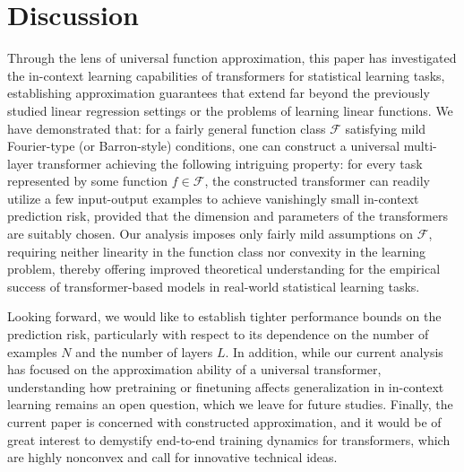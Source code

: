 \documentclass[english]{article}
\begin{document}

\section{Discussion}
\label{sec:discussion}

Through the lens of universal function approximation, this paper has investigated the in-context learning capabilities of transformers for statistical learning tasks,  
establishing approximation guarantees that extend far beyond the previously studied linear regression settings or the problems of learning linear functions. 
We have demonstrated that: for a fairly general function class $\mathcal{F}$ satisfying mild Fourier-type (or Barron-style) conditions, one can construct a universal multi-layer transformer achieving the following intriguing property:  for every task represented by some function $f\in\mathcal{F}$, 
the constructed transformer can readily utilize a few input-output examples to achieve vanishingly small in-context prediction risk, provided that the dimension and parameters of the transformers are suitably chosen. 
%
%
Our analysis imposes only fairly mild assumptions on $\mathcal{F}$, requiring neither linearity in the function class nor convexity in the learning problem, thereby offering improved theoretical understanding for the empirical success of transformer-based models in real-world statistical learning tasks.

Looking forward, we would like to establish tighter performance bounds on the prediction risk, particularly with respect to its dependence on the number of examples $N$ and the number of layers $L$. In addition, while our current analysis has focused on the approximation ability of a universal transformer, understanding how pretraining or finetuning affects generalization in in-context learning remains an open question, which we leave for future studies. Finally, the current paper is concerned with constructed approximation, and it would be of great interest to demystify end-to-end training dynamics for transformers, which are highly nonconvex and call for innovative technical ideas.  
\end{document}
